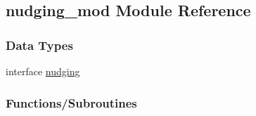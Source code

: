\hypertarget{namespacenudging__mod}{}\subsection{nudging\+\_\+mod Module Reference}
\label{namespacenudging__mod}
\subsubsection*{Data Types}
\begin{DoxyCompactItemize}
\item 
interface \mbox{\hyperlink{structnudging__mod_1_1nudging}{nudging}}
\end{DoxyCompactItemize}
\subsubsection*{Functions/\+Subroutines}
